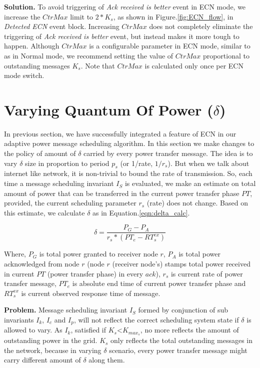 {\bf Solution. }To avoid triggering of \textit{Ack received is better} event in ECN mode, we increase the $CtrMax$ limit to $2*K_s$, as shown in Figure.\ref{fig:ECN_flow}, in \textit{Detected ECN} event block. Increasing $CtrMax$ does not completely eliminate the triggering of \textit{Ack received is better} event, but instead makes it more tough to happen. Although $CtrMax$ is a configurable parameter in ECN mode, similar to as in Normal mode, we recommend setting the value of $CtrMax$ proportional to outstanding messages $K_s$. Note that $CtrMax$ is calculated only once per ECN mode switch.

\section{Varying Quantum Of Power ($\delta$)}
\label{sec:vary_delta} 

In previous section, we have successfully integrated a feature of ECN in our adaptive power message scheduling algorithm.
In this section we make changes to the policy of amount of $\delta$ carried by every power transfer message.
The idea is to vary $\delta$ size in proportion to period $p_s$ (or 1/rate, $1/r_s$). But when we talk about 
internet like network, it is non-trivial to bound the rate of transmission. So, each time a message scheduling 
invariant $I_S$ is evaluated, we make an estimate on total amount of power that can be transferred in the  
current power transfer phase $PT$, provided, the current scheduling parameter $r_s$ (rate) does not change.
Based on this estimate, we calculate $\delta$ as in Equation.\ref{eqn:delta_calc}. 

\begin{equation}
\delta = \frac{P_G - P_A}{r_s * (PT_e - RT_s^{ex})} 
\label{eqn:delta_calc}
\end{equation}	

Where, $P_G$ is total power granted to receiver node $r$, $P_A$ is total power acknowledged from node $r$
(node $r$ (receiver node's) stamps total power received in current $PT$ (power transfer phase) in every $ack$), $r_s$ is current rate of power transfer message,
$PT_e$ is absolute end time of current power transfer phase and $RT_s^{ex}$ is current observed response time of
message.

{\bf Problem. }Message scheduling invariant $I_S$ formed by conjunction of sub invariants $I_k$, $I_c$ and $I_p$, will not reflect 
the correct scheduling system state if $\delta$ is allowed to vary. As $I_k$, satisfied if $K_s$<$K_{max_s}$, no more reflects 
the amount of outstanding power in the grid. $K_s$ only reflects the total outstanding messages in the network, because in varying 
$\delta$ scenario, every power transfer message might carry different amount of $\delta$ along them. 


